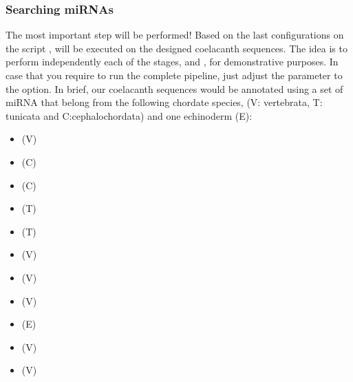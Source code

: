 \documentclass[letterpaper,10pt,english]{sphinxmanual}
\begin{document}
\subsubsection{Searching miRNAs}
\label{\detokenize{tutorial:searching-mirnas}}
The most important step will be performed! Based on the last configurations on
the script ,  will be executed on the designed
coelacanth sequences. The idea is to perform independently each of the stages,
 and , for demonstrative
purposes. In case that you require to run the complete pipeline, just adjust the
parameter  to the  option.
In brief, our  coelacanth sequences would be annotated using a set of
miRNA  that belong from the following chordate species, (V: vertebrata, T:
tunicata and C:cephalochordata) and one echinoderm (E):
\begin{itemize}
\item {} 
 (V)

\item {} 
 (C)

\item {} 
 (C)

\item {} 
 (T)

\item {} 
 (T)

\item {} 
 (V)

\item {} 
 (V)

\item {} 
 (V)

\item {} 
 (E)

\item {} 
 (V)

\item {} 
 (V)

\end{itemize}
\end{document}
